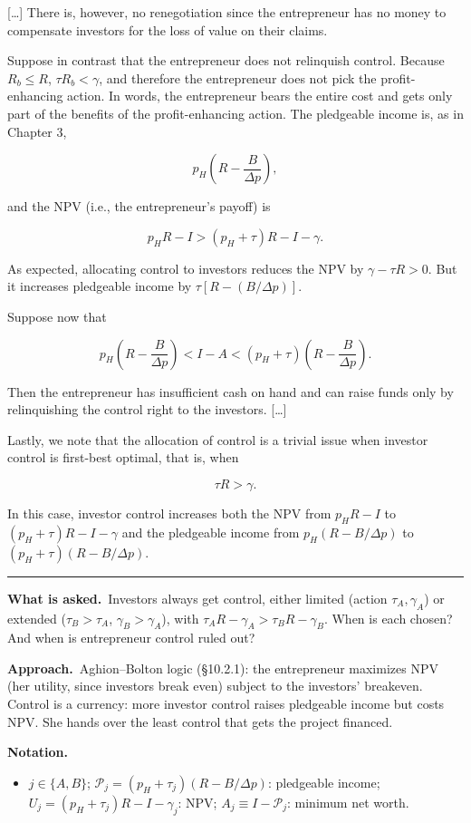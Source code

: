 \documentclass[11pt,a4paper]{article}
\newcommand{\notation}{\par\noindent\textbf{Notation.}}
\newcommand{\asked}{\par\medskip\noindent\textbf{What is asked.}~}
\newcommand{\approach}{\par\smallskip\noindent\textbf{Approach.}~}
\newcommand{\dpp}{\Delta p}
\newcommand{\stmtend}{\par\endgroup\nopagebreak\noindent\rule{\linewidth}{0.4pt}\par\medskip}
\begin{document}
{[}\ldots{]} There is, however, no renegotiation since the entrepreneur has no money to compensate
investors for the loss of value on their claims.

Suppose in contrast that the entrepreneur does not relinquish control. Because \(R_b \leqslant R\),
\(\tau R_b < \gamma\), and therefore the entrepreneur does not pick the profit-enhancing action. In
words, the entrepreneur bears the entire cost and gets only part of the benefits of the
profit-enhancing action. The pledgeable income is, as in Chapter 3,

\[p_H\left(R - \frac{B}{\Delta p}\right),\]

and the NPV (i.e., the entrepreneur's payoff) is

\[p_H R - I > (p_H + \tau)R - I - \gamma.\]

As expected, allocating control to investors reduces the NPV by \(\gamma - \tau R > 0\). But it
increases pledgeable income by \(\tau[R - (B/\Delta p)]\).

Suppose now that

\[p_H\left(R - \frac{B}{\Delta p}\right) < I - A < (p_H + \tau)\left(R - \frac{B}{\Delta p}\right).\]

Then the entrepreneur has insufficient cash on hand and can raise funds only by relinquishing the
control right to the investors. {[}\ldots{]}

Lastly, we note that the allocation of control is a trivial issue when investor control is
first-best optimal, that is, when

\[\tau R > \gamma.\]

In this case, investor control increases both the NPV from \(p_H R - I\) to
\((p_H + \tau)R - I - \gamma\) and the pledgeable income from \(p_H(R - B/\Delta p)\) to
\((p_H + \tau)(R - B/\Delta p)\).
\stmtend

\asked Investors always get control, either limited (action $\tau_A,\gamma_A$) or extended ($\tau_B>\tau_A$, $\gamma_B>\gamma_A$), with $\tau_AR-\gamma_A>\tau_BR-\gamma_B$. When is each chosen? And when is entrepreneur control ruled out?

\approach Aghion--Bolton logic (\S10.2.1): the entrepreneur maximizes NPV (her utility, since investors break even) subject to the investors' breakeven. Control is a currency: more investor control raises pledgeable income but costs NPV. She hands over the least control that gets the project financed.

\notation
\begin{itemize}
  \item $j\in\{A,B\}$; $\mathcal P_j=(p_H+\tau_j)(R-B/\dpp)$: pledgeable income; $U_j=(p_H+\tau_j)R-I-\gamma_j$: NPV; $A_j\equiv I-\mathcal P_j$: minimum net worth.
\end{itemize}
\end{document}
